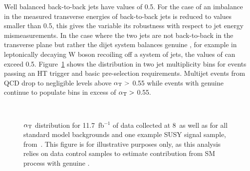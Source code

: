 Well balanced back-to-back jets have \alphat values of 0.5. 
For the case of an imbalance in the measured transverse energies 
of back-to-back jets \alphat is reduced to values smaller than 0.5, 
this gives the variable its robustness with respect to jet energy 
mismeasurements. In the case where the two jets are not back-to-back 
in the transverse plane but rather the dijet system balances genuine 
\met, for example in leptonically decaying W boson recoiling off a 
system of jets, the values of \alphat can exceed 0.5.
Figure~\ref{fig:alphat_dist} shows the \alphat 
distribution in two jet multiplicity bins for events passing 
an HT trigger and basic pre-selection requirements. Multijet 
events from QCD drop to negligible levels above $\alpha_{\text{T}}>$ 0.55
while events with genuine \met continue to populate bins in excess
of  $\alpha_{\text{T}}>$ 0.55.

\begin{figure}[h!t]
  \begin{center}
     \\
      \caption{\label{fig:alphat-2011} $\alpha_{\text{T}}$ distribution for 11.7~fb$^{-1}$ 
            of data collected at {8}~\tev as well as for all standard model 
            backgrounds and one example SUSY signal sample, from~\cite{RA1Paper2012}.
            This figure is for illustrative purposes only, as this analysis relies
            on data control samples to estimate contribution from SM process 
            with genuine \met.}
    \label{fig:alphat_dist}
  \end{center}
\end{figure}

